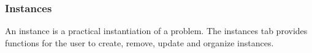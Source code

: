 \subsubsection{Instances}
 An instance is a practical instantiation of a problem. The instances tab provides functions for the user to create, remove, update and organize instances.

